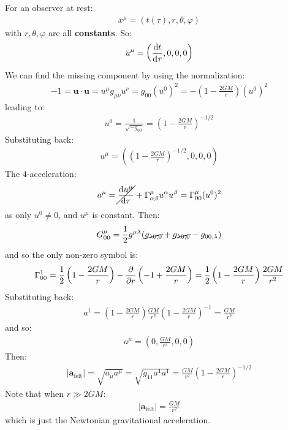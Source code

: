\documentclass[../template.tex]{subfiles}
\begin{document}
\begin{example}
    For an observer at rest:
    \begin{align*}
        x^\mu = (t(\tau), r, \theta, \varphi) 
    \end{align*}
    with $r, \theta, \varphi$ are all \textbf{constants}. So:
    \begin{align*}
        u^\mu = \left( \dv{t}{\tau}, 0, 0, 0\right)
    \end{align*}  
    We can find the missing component by using the normalization:
    \begin{align*}
        -1 = \bm{u} \cdot \bm{u} = u^\mu g_{\mu \nu} u^\nu = g_{00} (u^0)^2 = -\left(1-\frac{2GM}{r} \right) (u^0)^2 
    \end{align*}
    leading to:
    \begin{align*}
        u^0 = \frac{1}{\sqrt{-g_{00}}}  = \left(1-\frac{2GM}{r} \right)^{-1/2}
    \end{align*}
    Substituting back:
    \begin{align*}
        u^\mu = \left(\left(1-\frac{2GM}{r} \right)^{-1/2}, 0, 0, 0\right)
    \end{align*}
    The $4$-acceleration:
    \begin{align*}
        a^\mu = \cancel{\dv{u^\mu}{\tau}} + \Gamma^\mu_{\alpha \beta} u^\alpha u^\beta = \Gamma^\mu_{00} (u^0)^2
    \end{align*} 
    as only $u^0 \neq 0$, and $u^\mu$ is constant. Then:
    \begin{align*}
        G^\mu_{00} = \frac{1}{2}g^{\mu \lambda} (\cancel{g_{\lambda 0,0} }+ \cancel{g_{\lambda 0,0}} - g_{00, \lambda}) 
    \end{align*}  
    and so the only non-zero symbol is:
    \begin{align*}
        \Gamma_{00}^1 = \frac{1}{2} \left(1-\frac{2GM}{r} \right) - \pdv{r} \left(-1 + \frac{2GM}{r} \right) = \frac{1}{2}\left(1-\frac{2GM}{r} \right)  \frac{2GM}{r^2} 
    \end{align*}
    Substituting back:
    \begin{align*}
        a^1 = \left(1-\frac{2GM}{r} \right) \frac{GM}{r^2} \left(1-\frac{2GM}{r} \right)^{-1} = \frac{GM}{r^2} 
    \end{align*}
    and so:
    \begin{align*}
        a^\mu = \left(0, \frac{GM}{r^2}, 0,0 \right)
    \end{align*}
    Then:
    \begin{align*}
        |\bm{a}_{\mathrm{felt} }| = \sqrt{a_\mu a^\mu} = \sqrt{g_{11} a^1 a^1} = \frac{GM}{r^2} \left(1-\frac{2GM}{r} \right)  ^{-1/2} 
    \end{align*}
    Note that when $r \gg 2GM$:
    \begin{align*}
        |\bm{a}_{\mathrm{felt} }| = \frac{GM}{r^2} 
    \end{align*} 
    which is just the Newtonian gravitational acceleration.


\end{example}
\end{document}
